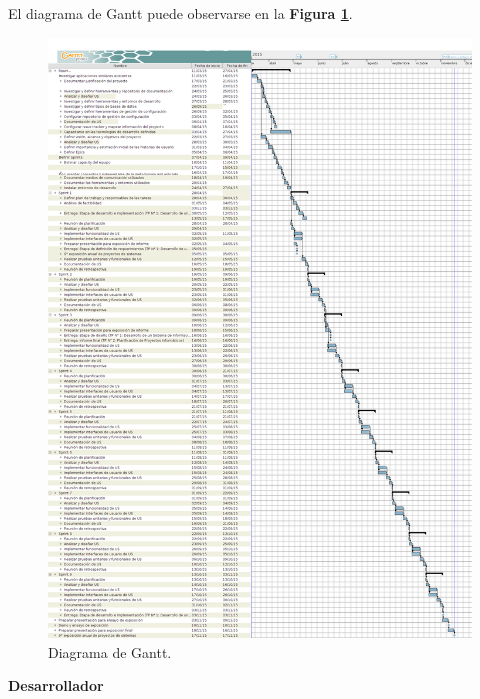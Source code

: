 El diagrama de Gantt puede observarse en la \textbf{Figura \ref{imagenGantt}}.

\begin{figure}
  \centering
  \includegraphics[width=.8\textwidth]{img/tp2_definicion/gantt}
  \caption{Diagrama de Gantt.}
  \label{imagenGantt}
\end{figure}

\newpage

                   
    
		\textbf{Desarrollador}
		
